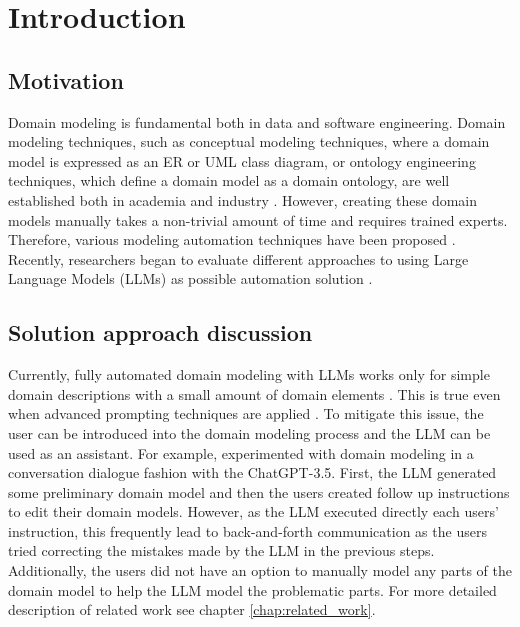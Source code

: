 \chapter*{Introduction}


\section*{Motivation}

Domain modeling is fundamental both in data and software engineering. Domain modeling techniques, such as conceptual modeling techniques, where a domain model is expressed as an ER or UML class diagram, or ontology engineering techniques, which define a domain model as a domain ontology, are well established both in academia and industry \cite{Verdonck2018}. However, creating these domain models manually takes a non-trivial amount of time and requires trained experts. Therefore, various modeling automation techniques have been proposed \cite{Sonbol2022}. Recently, researchers began to evaluate different approaches to using Large Language Models (LLMs) as possible automation solution \cite{Chen2023,Saeedizade2024}.


\section*{Solution approach discussion}

Currently, fully automated domain modeling with LLMs works only for simple domain descriptions with a small amount of domain elements \cite{Camara2023}. This is true even when advanced prompting techniques are applied \cite{Chen2023,Saeedizade2024}. To mitigate this issue, the user can be introduced into the domain modeling process \cite{Camara2023} and the LLM can be used as an assistant. For example, \citet{Camara2023} experimented with domain modeling in a conversation dialogue fashion with the ChatGPT-3.5. First, the LLM generated some preliminary domain model and then the users created follow up instructions to edit their domain models. However, as the LLM executed directly each users' instruction, this frequently lead to back-and-forth communication as the users tried correcting the mistakes made by the LLM in the previous steps. Additionally, the users did not have an option to manually model any parts of the domain model to help the LLM model the problematic parts. For more detailed description of related work see chapter \ref{chap:related_work}.


